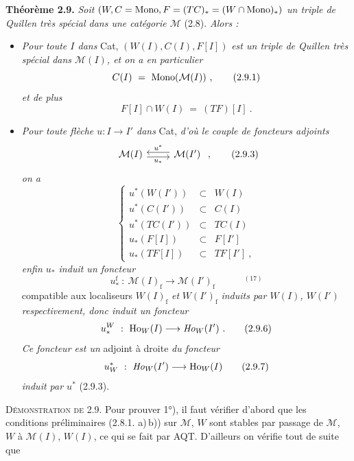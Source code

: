 \textbf{Théorème 2.9.} \textit{Soit} $(W, C = \mathrm{Mono}, F = (TC)_* = (W\cap\mathrm{Mono})_*)$ \textit{un triple de Quillen très spécial dans une catégorie $\mathcal{M}$} (2.8). \textit{Alors :}
\begin{itemize}[leftmargin=2.5em]
\item[1°)] \textit{Pour toute $I$ dans} Cat, $(W(I),C(I),F[I])$ \textit{est un triple de Quillen très spécial dans $\mathcal{M}(I)$, et on a en particulier}
\[ C(I) \ = \ \Mono(\mathcal{M}(I))\ , \tag*{(2.9.1)} \]
\textit{et de plus}
\[ F[I]\cap W(I) \ = \ (TF)[I]\ . \tag*{(2.9.2)} \]
\item[2°)] \textit{Pour toute flèche $u : I \longrightarrow I'$ dans} Cat, \textit{d'où le couple de foncteurs adjoints}
\[ \begin{tikzcd}
\mathcal{M}(I) \arrow[r, shift right, "u_*"'] & \mathcal{M}(I') \arrow[l, shift right, "u^*"']
\end{tikzcd}\ , \tag*{(2.9.3)} \]
\textit{on a}
\[ \left\{ \begin{array}{rcl}
u^*(W(I')) & \subset & W(I)\\
u^*(C(I')) & \subset & C(I)\\
u^*(TC(I')) & \subset & TC(I)\\
u_*(F[I]) & \subset & F[I']\\
u_*(TF[I]) & \subset & TF[I']\ ,
\end{array}\right. \tag*{(2.9.4)} \]
\textit{enfin $u_*$ induit un foncteur}
\[ u_*^{\mathrm{f}} \ :\ \mathcal{M}(I)_{\mathrm{f}} \longrightarrow \mathcal{M}(I')_{\mathrm{f}} \qquad\quad ^{(17)} \tag*{(2.9.5)} \]
compatible aux localiseurs $W(I)_{\mathrm{f}}$ \textit{et} $W(I')_{\mathrm{f}}$ \textit{induits par $W(I)$, $W(I')$ respectivement, donc induit un foncteur}
\[ u_*^W \ :\ \Ho_W(I) \longrightarrow \mathit{Ho}_W(I')\ . \tag*{(2.9.6)} \] %
\textit{Ce foncteur est un} adjoint à droite \textit{du foncteur}
\[ u_W^* \ :\ \mathit{Ho}_W(I') \longrightarrow \Ho_W(I) \tag*{(2.9.7)} \] %
\textit{induit par $u^*$} (2.9.3).
\end{itemize}
\textsc{Démonstration de 2.9.} Pour prouver 1°), il faut vérifier d'abord que les conditions préliminaires (2.8.1. a)\,b)) sur $\mathcal{M}$, $W$ sont stables par passage de $\mathcal{M}$, $W$ à $\mathcal{M}(I)$, $W(I)$, ce qui se fait par AQT. D'ailleurs on vérifie tout de suite que
